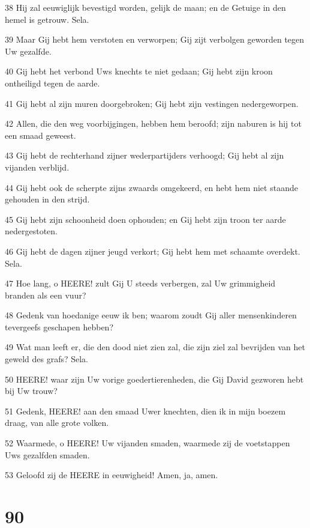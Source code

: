 \par 38 Hij zal eeuwiglijk bevestigd worden, gelijk de maan; en de Getuige in den hemel is getrouw. Sela.
\par 39 Maar Gij hebt hem verstoten en verworpen; Gij zijt verbolgen geworden tegen Uw gezalfde.
\par 40 Gij hebt het verbond Uws knechts te niet gedaan; Gij hebt zijn kroon ontheiligd tegen de aarde.
\par 41 Gij hebt al zijn muren doorgebroken; Gij hebt zijn vestingen nedergeworpen.
\par 42 Allen, die den weg voorbijgingen, hebben hem beroofd; zijn naburen is hij tot een smaad geweest.
\par 43 Gij hebt de rechterhand zijner wederpartijders verhoogd; Gij hebt al zijn vijanden verblijd.
\par 44 Gij hebt ook de scherpte zijns zwaards omgekeerd, en hebt hem niet staande gehouden in den strijd.
\par 45 Gij hebt zijn schoonheid doen ophouden; en Gij hebt zijn troon ter aarde nedergestoten.
\par 46 Gij hebt de dagen zijner jeugd verkort; Gij hebt hem met schaamte overdekt. Sela.
\par 47 Hoe lang, o HEERE! zult Gij U steeds verbergen, zal Uw grimmigheid branden als een vuur?
\par 48 Gedenk van hoedanige eeuw ik ben; waarom zoudt Gij aller mensenkinderen tevergeefs geschapen hebben?
\par 49 Wat man leeft er, die den dood niet zien zal, die zijn ziel zal bevrijden van het geweld des grafs? Sela.
\par 50 HEERE! waar zijn Uw vorige goedertierenheden, die Gij David gezworen hebt bij Uw trouw?
\par 51 Gedenk, HEERE! aan den smaad Uwer knechten, dien ik in mijn boezem draag, van alle grote volken.
\par 52 Waarmede, o HEERE! Uw vijanden smaden, waarmede zij de voetstappen Uws gezalfden smaden.
\par 53 Geloofd zij de HEERE in eeuwigheid! Amen, ja, amen.

\chapter{90}

